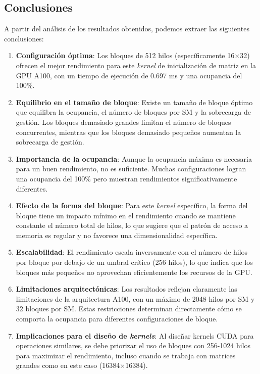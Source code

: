     \subsection{Conclusiones}

        A partir del análisis de los resultados obtenidos, podemos extraer las siguientes conclusiones:

        \begin{enumerate}
         
            \item \textbf{Configuración óptima}: Los bloques de 512 hilos (específicamente 16×32) ofrecen el mejor rendimiento para este \textit{kernel} de inicialización de matriz en la GPU A100, con un tiempo de ejecución de 0.697 ms y una ocupancia del 100\%.
            
            \item \textbf{Equilibrio en el tamaño de bloque}: Existe un tamaño de bloque óptimo que equilibra la ocupancia, el número de bloques por SM y la sobrecarga de gestión. Los bloques demasiado grandes limitan el número de bloques concurrentes, mientras que los bloques demasiado pequeños aumentan la sobrecarga de gestión.
            
            \item \textbf{Importancia de la ocupancia}: Aunque la ocupancia máxima es necesaria para un buen rendimiento, no es suficiente. Muchas configuraciones logran una ocupancia del 100\% pero muestran rendimientos significativamente diferentes.
            
            \item \textbf{Efecto de la forma del bloque}: Para este \textit{kernel} específico, la forma del bloque tiene un impacto mínimo en el rendimiento cuando se mantiene constante el número total de hilos, lo que sugiere que el patrón de acceso a memoria es regular y no favorece una dimensionalidad específica.
            
            \item \textbf{Escalabilidad}: El rendimiento escala inversamente con el número de hilos por bloque por debajo de un umbral crítico (256 hilos), lo que indica que los bloques más pequeños no aprovechan eficientemente los recursos de la GPU.
            
            \item \textbf{Limitaciones arquitectónicas}: Los resultados reflejan claramente las limitaciones de la arquitectura A100, con un máximo de 2048 hilos por SM y 32 bloques por SM. Estas restricciones determinan directamente cómo se comporta la ocupancia para diferentes configuraciones de bloque.
            
            \item \textbf{Implicaciones para el diseño de \textit{kernels}}: Al diseñar kernels CUDA para operaciones similares, se debe priorizar el uso de bloques con 256-1024 hilos para maximizar el rendimiento, incluso cuando se trabaja con matrices grandes como en este caso (16384×16384).
      
        \end{enumerate}
        
